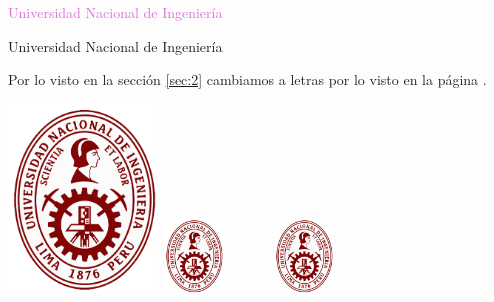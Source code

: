 \documentclass{article}
\begin{document}
\textcolor{Orchid}{Universidad Nacional de Ingeniería}

{\color{Peach} Universidad Nacional de Ingeniería}



\newpage


Por lo visto en la sección \ref{sec:2} cambiamos a letras por lo visto en la página \pageref{sec:2}.

\newpage

\includegraphics[width=4cm]{logo.png}%
\includegraphics[height=2cm]{logo}%
\includegraphics[width=4cm,height=2cm]{logo}
\end{document}
